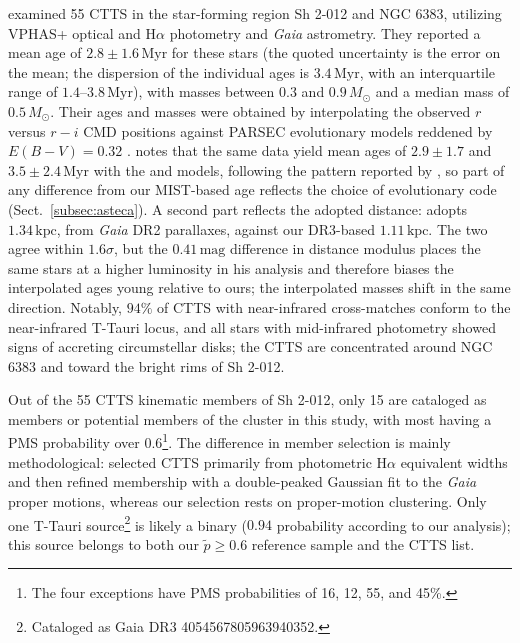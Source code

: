 \documentclass{aa}
\begin{document}
\citet{2019MNRAS.484.5102K} examined 55 CTTS in the star-forming region Sh 2-012 and NGC 6383, utilizing VPHAS+ optical and H$\alpha$ photometry and \textit{Gaia} astrometry. They reported a mean age of $2.8 \pm 1.6\,\mathrm{Myr}$ for these stars (the quoted uncertainty is the error on the mean; the dispersion of the individual ages is $3.4\,\mathrm{Myr}$, with an interquartile range of $1.4$--$3.8\,\mathrm{Myr}$), with masses between $0.3$ and $0.9\,M_\odot$ and a median mass of $0.5\,M_\odot$. Their ages and masses were obtained by interpolating the observed $r$ versus $r-i$ CMD positions against PARSEC evolutionary models reddened by $E(B-V)=0.32$ \citep{2012MNRAS.427..127B}. \citet{2019MNRAS.484.5102K} notes that the same data yield mean ages of $2.9\pm1.7$ and $3.5\pm2.4\,\mathrm{Myr}$ with the \citet{2011A&A...533A.109T} and \citet{2000A&A...358..593S} models, following the pattern reported by \citet{2015ApJ...808...23H}, so part of any difference from our MIST-based age reflects the choice of evolutionary code (Sect.~\ref{subsec:asteca}). A second part reflects the adopted distance: \citet{2019MNRAS.484.5102K} adopts $1.34\,\mathrm{kpc}$, from \textit{Gaia} DR2 parallaxes, against our DR3-based $1.11\,\mathrm{kpc}$. The two agree within $1.6\sigma$, but the $0.41\,\mathrm{mag}$ difference in distance modulus places the same stars at a higher luminosity in his analysis and therefore biases the interpolated ages young relative to ours; the interpolated masses shift in the same direction. Notably, $94\%$ of CTTS with near-infrared cross-matches conform to the near-infrared T-Tauri locus, and all stars with mid-infrared photometry showed signs of accreting circumstellar disks; the CTTS are concentrated around NGC 6383 and toward the bright rims of Sh 2-012.  %

Out of the 55 CTTS kinematic members of Sh 2-012, only 15 are cataloged as members or potential members of the cluster in this study, with most having a PMS probability over $0.6$\footnote{The four exceptions have PMS probabilities of 16, 12, 55, and 45\%.}. The difference in member selection is mainly methodological: \citet{2019MNRAS.484.5102K} selected CTTS primarily from photometric H$\alpha$ equivalent widths and then refined membership with a double-peaked Gaussian fit to the \textit{Gaia} proper motions, whereas our selection rests on proper-motion clustering. Only one T-Tauri source\footnote{Cataloged as Gaia DR3 4054567805963940352.} is likely a binary ($0.94$ probability according to our analysis); this source belongs to both our $\tilde{p}\geq0.6$ reference sample and the \citet{2019MNRAS.484.5102K} CTTS list.  %
\end{document}
